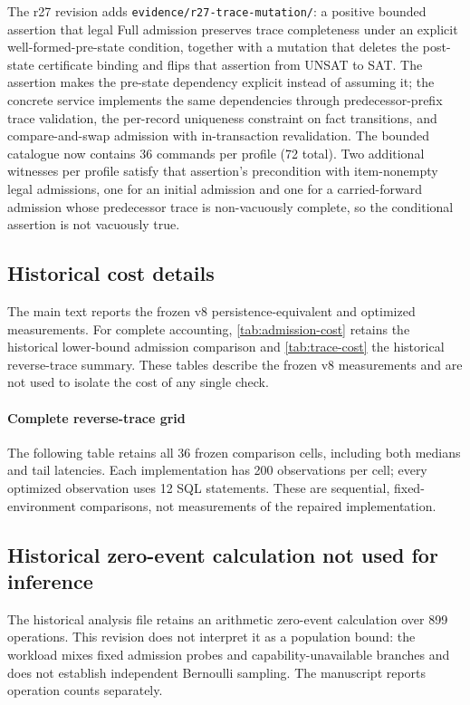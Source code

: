 \documentclass[preprint,12pt,authoryear]{elsarticle}
\newcommand{\code}[1]{\nolinkurl{#1}}
\begin{document}
The r27 revision adds \code{evidence/r27-trace-mutation/}: a positive bounded assertion that legal Full admission preserves trace completeness under an explicit well-formed-pre-state condition, together with a mutation that deletes the post-state certificate binding and flips that assertion from UNSAT to SAT. The assertion makes the pre-state dependency explicit instead of assuming it; the concrete service implements the same dependencies through predecessor-prefix trace validation, the per-record uniqueness constraint on fact transitions, and compare-and-swap admission with in-transaction revalidation. The bounded catalogue now contains 36 commands per profile (72 total). Two additional witnesses per profile satisfy that assertion's precondition with item-nonempty legal admissions, one for an initial admission and one for a carried-forward admission whose predecessor trace is non-vacuously complete, so the conditional assertion is not vacuously true.


\subsection{Historical cost details}
\label{app:historical-cost}

The main text reports the frozen v8 persistence-equivalent and optimized measurements. For complete accounting, \cref{tab:admission-cost} retains the historical lower-bound admission comparison and \cref{tab:trace-cost} the historical reverse-trace summary. These tables describe the frozen v8 measurements and are not used to isolate the cost of any single check.





\paragraph{Complete reverse-trace grid}
The following table retains all 36 frozen comparison cells, including both medians and tail latencies. Each implementation has 200 observations per cell; every optimized observation uses 12 SQL statements. These are sequential, fixed-environment comparisons, not measurements of the repaired implementation.


\subsection{Historical zero-event calculation not used for inference}
\label{app:zero-event}
The historical analysis file retains an arithmetic zero-event calculation over 899 operations. This revision does not interpret it as a population bound: the workload mixes fixed admission probes and capability-unavailable branches and does not establish independent Bernoulli sampling. The manuscript reports operation counts separately.
\end{document}
